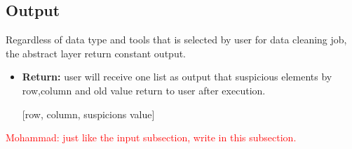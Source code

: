 \documentclass[12pt]{article}
\newcommand{\mohammad}[1]{\textcolor{red}{Mohammad: #1}}
\begin{document}
\subsection{Output}
Regardless of data type and tools that is selected by user for data cleaning job, the abstract layer return constant output.
\begin{itemize}
	\item \textbf{Return:}
	user will receive one list as output that suspicious elements by row,column and old value return to user after execution.
	
	[row, column, suspicions value]
	 
\end{itemize}

\mohammad{just like the input subsection, write in this subsection.}




\end{document}
